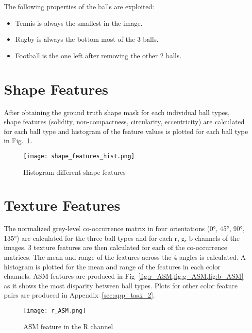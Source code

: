 \documentclass{report}
\begin{document}
The following properties of the balls are exploited:

\begin{itemize}
    \item Tennis is always the smallest in the image.
    \item Rugby is always the bottom most of the 3 balls.
    \item Football is the one left after removing the other 2 balls.
\end{itemize}

\section{Shape Features}

After obtaining the ground truth shape mask for each individual ball types, shape features (solidity, non-compactness\cite{westenbergVolumetricAttributeFiltering2007,bosiljConnectedAttributeMorphology2018}, circularity\cite{zunicHuMomentInvariant2010}, eccentricity) are calculated for each ball type and histogram of the feature values is plotted for each ball type in Fig.~\ref{fig:shape_features_hist}.

\begin{figure}[ht]
    \centering
    \texttt{[image: shape\_features\_hist.png]}
    \caption{Histogram different shape features}
    \label{fig:shape_features_hist}
\end{figure}

\section{Texture Features}

The normalized grey-level co-occurrence matrix in four orientations (0°, 45°, 90°, 135°) are calculated for the three ball types and for each r, g, b channels of the images. 3 texture features are then calculated for each of the co-occurrence matrices. The mean and range of the features across the 4 angles is calculated. A histogram is plotted for the mean and range of the features in each color channels. ASM features are produced in Fig~\cref{fig:r_ASM,fig:g_ASM,fig:b_ASM} as it shows the most disparity between ball types. Plots for other color feature pairs are produced in Appendix~\ref{sec:app_task_2}.

\begin{figure}[ht]
    \centering
    \texttt{[image: r\_ASM.png]}
    \caption{ASM feature in the R channel}
    \label{fig:r_ASM}
\end{figure}
\end{document}
